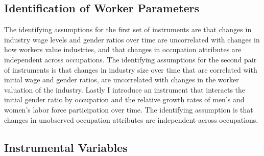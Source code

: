 \documentclass[12pt]{article}
\begin{document}







\subsection{Identification of Worker Parameters}

The identifying assumptions for the first set of instruments are that changes in industry wage levels and gender ratios over time are uncorrelated with changes in how workers value industries, and that changes in occupation attributes are independent across occupations. The identifying assumptions for the second pair of instruments is that changes in industry size over time that are correlated with initial wage and gender ratios, are uncorrelated with changes in the worker valuation of the industry. Lastly I introduce an instrument that interacts the initial gender ratio by occupation and the relative growth rates of men's and women's labor force participation over time. The identifying assumption is that changes in unobserved occupation attributes are independent across occupations.

 

\subsection{Instrumental Variables}
\end{document}
